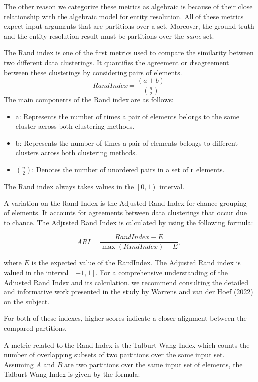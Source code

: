 \documentclass[a4paper,twoside]{article}
\begin{document}
    The other reason we categorize these metrics as algebraic is because of
    their close relationship with the algebraic model for entity resolution.
    All of these metrics expect input arguments that are partitions over a set.
    Moreover, the ground truth and the entity resolution result must be
    partitions over the \textit{same} set.
    
    The Rand index is one of the first metrics used to compare the similarity
    between two different data clusterings.
    It quantifies the agreement or disagreement between these clusterings by
    considering pairs of elements.
        \[Rand Index = \frac{(a + b)}{{n \choose 2}}\]
    The main components of the Rand index are as follows:
    \begin{itemize}
    \item a: Represents the number of times a pair of elements belongs to the
        same cluster across both clustering methods.
    \item b: Represents the number of times a pair of elements belongs to
        different clusters across both clustering methods.
    \item $n \choose 2$: Denotes the number of unordered pairs in a set of n
        elements.
    \end{itemize}
    
    The Rand index always takes values in the $\left[0, 1\right)$ interval.

    A variation on the Rand Index is the Adjusted Rand Index for chance grouping
    of elements.
    It accounts for agreements between data clusterings that occur due to
    chance\cite{adjrand2001}.
    The Adjusted Rand Index is calculated by using the following formula:
    
    \[ ARI = \frac{RandIndex - E}{\max(RandIndex) - E}, \]

    where $E$ is the expected value of the RandIndex.
    The Adjusted Rand index is valued in the interval $\left[-1, 1\right]$.
    For a comprehensive understanding of the Adjusted Rand Index and its
    calculation, we recommend consulting the detailed and informative work
    presented in the study by Warrens and van der Hoef (2022) on the
    subject\cite{warrens2022understanding}.

    For both of these indexes, higher scores indicate a closer alignment between
    the compared partitions.

    A metric related to the Rand Index is the Talburt-Wang Index which counts
    the number of overlapping subsets of two partitions over the same input set.
    Assuming $A$ and $B$ are two partitions over the same input set of elements,
    the Talburt-Wang Index is given by the formula:
\end{document}
